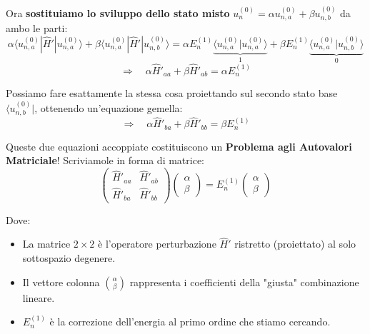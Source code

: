 \documentclass[11pt, a4paper]{article}
\begin{document}
\noindent
Ora \textbf{sostituiamo lo sviluppo dello stato misto} $u_n^{(0)} = \alpha u_{n,a}^{(0)} + \beta u_{n,b}^{(0)}$ da ambo le parti:
\begin{equation*}
    \alpha \langle u_{n,a}^{(0)} | \hat{H}' | u_{n,a}^{(0)} \rangle + \beta \langle u_{n,a}^{(0)} | \hat{H}' | u_{n,b}^{(0)} \rangle = \alpha E_n^{(1)} \underbrace{ \langle u_{n,a}^{(0)} | u_{n,a}^{(0)} \rangle }_{1} + \beta E_n^{(1)} \underbrace{ \langle u_{n,a}^{(0)} | u_{n,b}^{(0)} \rangle }_{0} %
\end{equation*}
\begin{equation}
    \Rightarrow \quad \alpha \hat{H}'_{aa} + \beta \hat{H}'_{ab} = \alpha E_n^{(1)} \label{eq:sec1} %
\end{equation}

\noindent
Possiamo fare esattamente la stessa cosa proiettando sul secondo stato base $\langle u_{n,b}^{(0)} |$, ottenendo un'equazione gemella:
\begin{equation}
    \Rightarrow \quad \alpha \hat{H}'_{ba} + \beta \hat{H}'_{bb} = \beta E_n^{(1)} \label{eq:sec2} %
\end{equation}

\noindent
Queste due equazioni accoppiate costituiscono un \textbf{Problema agli Autovalori Matriciale}! Scriviamole in forma di matrice:
\begin{equation}
    \begin{pmatrix} \hat{H}'_{aa} & \hat{H}'_{ab} \\ \hat{H}'_{ba} & \hat{H}'_{bb} \end{pmatrix} \begin{pmatrix} \alpha \\ \beta \end{pmatrix} = E_n^{(1)} \begin{pmatrix} \alpha \\ \beta \end{pmatrix} %
\end{equation}

Dove:
\begin{itemize}
    \item La matrice $2 \times 2$ è l'operatore perturbazione $\hat{H}'$ ristretto (proiettato) al solo sottospazio degenere.
    \item Il vettore colonna $\binom{\alpha}{\beta}$ rappresenta i coefficienti della "giusta" combinazione lineare.
    \item $E_n^{(1)}$ è la correzione dell'energia al primo ordine che stiamo cercando.
\end{itemize}
\end{document}

